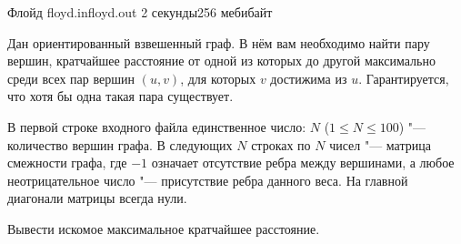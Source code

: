 \begin{problem}{Флойд}
{floyd.in}{floyd.out}
{2 секунды}{256 мебибайт}{}

Дан ориентированный взвешенный граф. В нём вам необходимо найти пару вершин,
кратчайшее расстояние от одной из которых до другой максимально
среди всех пар вершин $(u, v)$, для которых $v$ достижима из $u$.
Гарантируется, что хотя бы одна такая пара существует.

\InputFile

В первой строке входного файла единственное число: $N$
($1 \le N \le 100$) "--- количество вершин графа.
В следующих $N$ строках по $N$ чисел "--- матрица смежности графа,
где $-1$ означает отсутствие ребра между вершинами,
а любое неотрицательное число "--- присутствие ребра данного веса.
На главной диагонали матрицы всегда нули.

\OutputFile

Вывести искомое максимальное кратчайшее расстояние.

\Example

\begin{example}
%
\end{example}

\end{problem}
